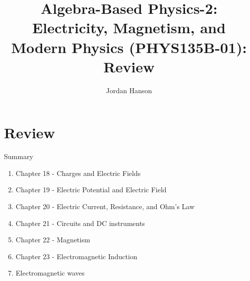 \documentclass{beamer}
\title{Algebra-Based Physics-2: Electricity, Magnetism, and Modern Physics (PHYS135B-01): Review}
\author{Jordan Hanson}
\institute{Whittier College Department of Physics and Astronomy}
\begin{document}
\maketitle

\section{Review}

\begin{frame}{Summary}
\begin{enumerate}
\item Chapter 18 - Charges and Electric Fields
\item Chapter 19 - Electric Potential and Electric Field
\item Chapter 20 - Electric Current, Resistance, and Ohm's Law
\item Chapter 21 - Circuits and DC instruments
\item Chapter 22 - Magnetism
\item Chapter 23 - Electromagnetic Induction
\item Electromagnetic waves
\end{enumerate}
\end{frame}
\end{document}
